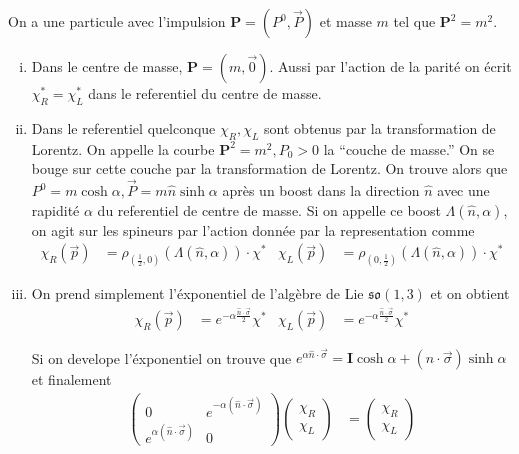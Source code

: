 \documentclass[10pt]{report}
\begin{document}
On a une particule avec l'impulsion $\mathbf{P} = \left( P^0, \vec{P} \right)$ et masse $m$ tel que $\mathbf{P}^2 = m^2$. 
\begin{enumerate}[i)]
    \item Dans le centre de masse, $\mathbf{P} = \left( m, \vec{0} \right)$. Aussi par l'action de la parit\'e on \'ecrit $\chi_R^* = \chi_L^*$ dans le referentiel du centre de masse.
    \item Dans le referentiel quelconque $\chi_R, \chi_L$ sont obtenus par la transformation de Lorentz. On appelle la courbe $\mathbf{P}^2 = m^2, P_0 > 0$ la ``couche de masse.'' On se bouge sur cette couche par la transformation de Lorentz. On trouve alors que $P^0 = m\cosh \alpha, \vec{P} = m\hat{n}\sinh\alpha$ apr\`es un boost dans la direction $\hat{n}$ avec une rapidit\'e $\alpha$ du referentiel de centre de masse. Si on appelle ce boost $\Lambda(\hat{n},\alpha)$, on agit sur les spineurs par l'action donn\'ee par la representation comme
        \begin{align}
            \chi_R(\vec{p}) &= \rho_{\left( \frac{1}{2},0 \right)}\left( \Lambda(\hat{n},\alpha) \right) \cdot \chi^{*}&
            \chi_L(\vec{p}) &= \rho_{\left( 0, \frac{1}{2} \right)}\left( \Lambda(\hat{n},\alpha) \right) \cdot \chi^{*}
        \end{align}

    \item On prend simplement l'\'exponentiel de l'alg\`ebre de Lie $\mathfrak{so}(1,3)$ et on obtient
        \begin{align}
            \chi_R(\vec{p}) &= e^{-\alpha\frac{\hat{n}\cdot\vec{\sigma}}{2}} \chi^{*}&
            \chi_L(\vec{p}) &= e^{-\alpha\frac{\hat{n}\cdot\vec{\sigma}}{2}} \chi^{*}
        \end{align}

        Si on develope l'\'exponentiel on trouve que $e^{\alpha \hat{n} \cdot \vec{\sigma}} = \mathbf{I}\cosh \alpha + \left( \hat{n} \cdot \vec{\sigma} \right) \sinh \alpha$ et finalement
        \begin{align}
            \begin{pmatrix} 0 & e^{-\alpha(\hat{n} \cdot \vec{\sigma})}\\e^{\alpha(\hat{n} \cdot \vec{\sigma})} & 0 \end{pmatrix} \begin{pmatrix} \chi_R \\ \chi_L \end{pmatrix} &= \begin{pmatrix} \chi_R \\ \chi_L \end{pmatrix} 
        \end{align}


\end{enumerate}
\end{document}
